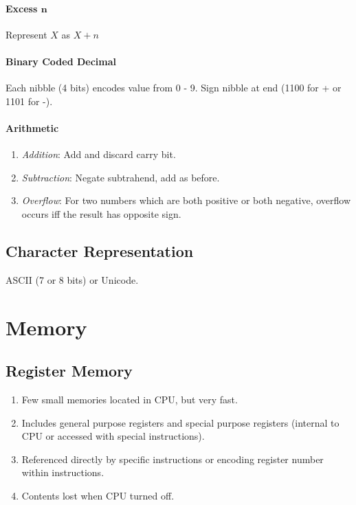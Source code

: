 \documentclass[twocolumn,english]{article}
\begin{document}
\paragraph{Excess $\boldsymbol{n}$}

Represent $X$ as $X+n$


\paragraph{Binary Coded Decimal}

Each nibble (4 bits) encodes value from 0 - 9. Sign nibble at end
(1100 for + or 1101 for -).


\paragraph{Arithmetic}
\begin{enumerate}
\item \emph{Addition}: Add and discard carry bit.
\item \emph{Subtraction}: Negate subtrahend, add as before.
\item \emph{Overflow}: For two numbers which are both positive or both negative,
overflow occurs iff the result has opposite sign.
\end{enumerate}

\subsection{Character Representation}

ASCII (7 or 8 bits) or Unicode.


\section{Memory}


\subsection{Register Memory}
\begin{enumerate}
\item Few small memories located in CPU, but very fast.
\item Includes general purpose registers and special purpose registers (internal
to CPU or accessed with special instructions).
\item Referenced directly by specific instructions or encoding register
number within instructions.
\item Contents lost when CPU turned off.
\end{enumerate}
\end{document}
